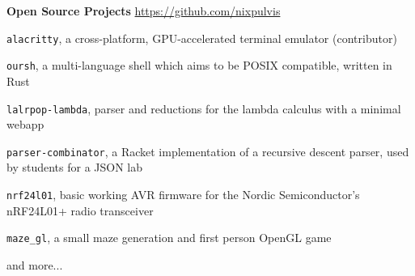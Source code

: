 \item
\headerrow
{\textbf{Open Source Projects}}
{\url{https://github.com/nixpulvis}}
\begin{itemize*}
    \item \texttt{alacritty}, a cross-platform, GPU-accelerated terminal emulator (contributor)
    \item \texttt{oursh}, a multi-language shell which aims to be POSIX
    compatible, written in Rust
    \item \texttt{lalrpop-lambda}, parser and reductions for the lambda
    calculus with a minimal webapp
    \item \texttt{parser-combinator}, a Racket implementation of a recursive
    descent parser, used by students for a JSON lab
    \item \texttt{nrf24l01}, basic working AVR firmware for the Nordic
    Semiconductor's nRF24L01+ radio transceiver
    \item \texttt{maze\_gl}, a small maze generation and first person OpenGL game
    \item and more...
\end{itemize*}
